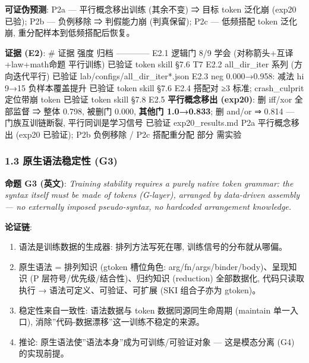 \documentclass[
]{article}
\providecommand{\tightlist}{%
  \setlength{\itemsep}{0pt}\setlength{\parskip}{0pt}}
\begin{document}
\textbf{可证伪预测}: P2a --- 平行概念移出训练 (其余不变) ⇒ 目标 token
泛化崩 (exp20 已验); P2b --- 负例移除 ⇒ 判假能力崩 (判真保留); P2c ---
低频搭配 token 泛化崩, 重分配样本到低频搭配后恢复。

\textbf{证据 (E2)}: \textbar{} \# \textbar{} 证据 \textbar{} 强度
\textbar{} 归档 \textbar{}
\textbar---\textbar---\textbar---\textbar---\textbar{} \textbar{} E2.1
\textbar{} 逻辑门 8/9 学会 (对称箭头+互译+law+math命题 平行训练)
\textbar{} 已验证 \textbar{} token skill §7.6 T7 \textbar{} \textbar{}
E2.2 \textbar{} all\_dir\_iter 系列 (方向迭代平行) \textbar{} 已验证
\textbar{} lab/configs/all\_dir\_iter*.json \textbar{} \textbar{} E2.3
\textbar{} neg 0.000→0.958: 减法 hi 9→15 负样本覆盖提升 \textbar{}
已验证 \textbar{} token skill §7.6 \textbar{} \textbar{} E2.4 \textbar{}
搭配对 ≥3 标准; crash\_culprit 定位带崩 token \textbar{} 已验证
\textbar{} token skill §7.8 \textbar{} \textbar{} E2.5 \textbar{}
\textbf{平行概念移出 (exp20)}: 删 iff/xor 全部监督 ⇒ 整体 0.798, 被删门
0.000, \textbf{其他门 1.0→0.833}; 删 and/or ⇒ 0.814 --- 门族互训链断裂,
平行同训是学习信号 \textbar{} 已验证 \textbar{} exp20\_results.md
\textbar{} \textbar{} P2a \textbar{} 平行概念移出 (exp20 已验证); P2b
负例移除 / P2c 搭配重分配 \textbar{} 部分 \textbar{} 需实验 \textbar{}

\subsubsection{1.3 原生语法稳定性
(G3)}\label{ux539fux751fux8bedux6cd5ux7a33ux5b9aux6027-g3}

\textbf{命题 G3 (英文)}: \emph{Training stability requires a purely
native token grammar: the syntax itself must be made of tokens
(G-layer), arranged by data-driven assembly --- no externally imposed
pseudo-syntax, no hardcoded arrangement knowledge.}

\textbf{论证链}:

\begin{enumerate}
\def\labelenumi{\arabic{enumi}.}
\tightlist
\item
  语法是训练数据的生成器: 排列方法写死在哪, 训练信号的分布就从哪偏。
\item
  原生语法 = 排列知识 (gtoken 槽位角色:
  arg/fn/args/binder/body)、呈现知识 (P 层符号/优先级/结合性)、归约知识
  (reduction) 全部数据化, 代码只读取执行 → 语法可定义、可验证、可扩展
  (SKI 组合子亦为 gtoken)。
\item
  稳定性来自一致性: 语法数据与 token 数据同源同生命周期 (maintain
  单一入口), 消除''代码-数据漂移''这一训练不稳定的来源。
\item
  推论: 原生语法使''语法本身''成为可训练/可验证对象 --- 这是模态分离
  (G4) 的实现前提。
\end{enumerate}
\end{document}
